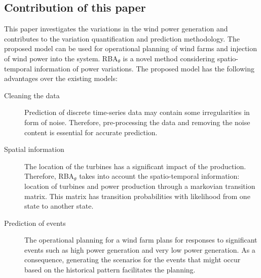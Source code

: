 \subsection{Contribution of this paper}
This paper investigates the variations in the wind power generation and contributes to the variation quantification and prediction methodology. The proposed model can be used for operational planning of wind farms and injection of wind power into the system.
RBA$_\theta$ is a novel method considering spatio-temporal information of power variations. The proposed model has the following advantages over the existing models: 
\begin{description}
\item[Cleaning the data] Prediction of discrete time-series data may contain some irregularities in form of noise. Therefore, pre-processing the data and removing the noise content is essential for accurate prediction. 
\item[Spatial information] The location of the turbines has a significant impact of the production. Therefore, RBA$_\theta$ takes into account the spatio-temporal information: location of turbines and power production through a markovian transition matrix. This matrix has transition probabilities with likelihood from one state to another state.
\item[Prediction of events] The operational planning for a wind farm plans for responses to significant events such as high power generation and very low power generation. As a consequence, generating the scenarios for the events that might occur based on the historical pattern facilitates the planning.
\end{description}
 